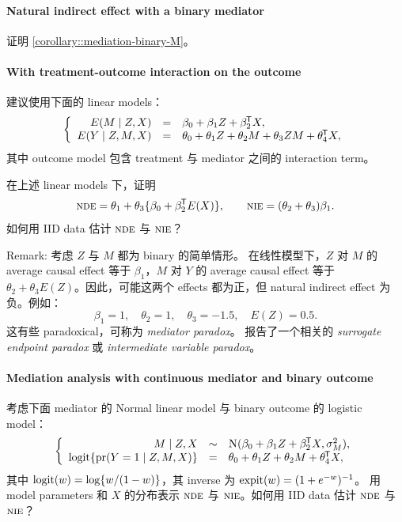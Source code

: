 \paragraph{Natural indirect effect with a binary mediator}\label{para::nie-binary-m}

证明 \cref{corollary::mediation-binary-M}。


\paragraph{With treatment-outcome interaction on the outcome}\label{para::interaction}
\citet{vanderweele2015explanation} 建议使用下面的 linear models：
$$
\left\{\begin{array}{rcl}
E(M \mid Z, X) &=&  \beta_0 + \beta_1 Z + \beta_2^{\mkern-1.5mu\mathsf{T}} X, \\
E(Y\mid Z,M,X) &=& \theta_0 + \theta_1 Z + \theta_2 M + \theta_3 ZM + \theta_4^{\mkern-1.5mu\mathsf{T}} X,
\end{array}\right.
$$
其中 outcome model 包含 treatment 与 mediator 之间的 interaction term。


在上述 linear models 下，证明
$$
\textsc{nde} = \theta_1 + \theta_3\{ \beta_0 + \beta_2^{\mkern-1.5mu\mathsf{T}} E(X)\}, \qquad 
\textsc{nie} = (\theta_2 + \theta_3 ) \beta_1. 
$$
如何用 IID data 估计 $\textsc{nde}$ 与 $\textsc{nie}$？

Remark:
考虑 $Z$ 与 $M$ 都为 binary 的简单情形。
在线性模型下，$Z$ 对 $M$ 的 average causal effect 等于 $\beta_1$，$M$ 对 $Y$ 的 average causal effect 等于 $\theta_2+\theta_3E(Z)$。因此，可能这两个 effects 都为正，但 natural indirect effect 为负。例如：
$$
\beta_1 = 1,\quad \theta_2 = 1, \quad  \theta_3= -1.5, \quad E(Z) = 0.5.
$$ 
这有些 paradoxical，可称为 {\it mediator paradox}。\citet{chen2007criteria} 报告了一个相关的 {\it surrogate endpoint paradox} 或 {\it intermediate variable paradox}。



\paragraph{Mediation analysis with continuous mediator and binary outcome}\label{para::continM-binaryY}


考虑下面 mediator 的 Normal linear model 与 binary outcome 的 logistic model：
$$
\left\{\begin{array}{rcl}
M \mid Z, X &\sim &  \textsc{N}(\beta_0 + \beta_1 Z + \beta_2^{\mkern-1.5mu\mathsf{T}} X, \sigma_M^2), \\
\textup{logit} \{ \textup{pr}(Y = 1 \mid Z,M,X ) \} &=& \theta_0 + \theta_1 Z + \theta_2 M +   \theta_4^{\mkern-1.5mu\mathsf{T}} X,
\end{array}\right.
$$
其中 $\textup{logit}(w)=\log\{w/(1-w)\}$，其 inverse 为 $\textup{expit}(w)=(1+e^{-w})^{-1}$。
用 model parameters 和 $X$ 的分布表示 $\textsc{nde}$ 与 $\textsc{nie}$。如何用 IID data 估计 $\textsc{nde}$ 与 $\textsc{nie}$？




